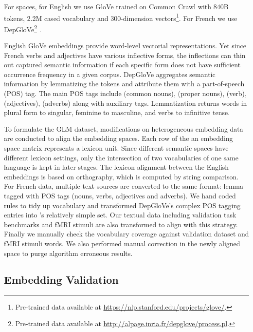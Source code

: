 For  spaces, for English we use GloVe \parencite{penningtonGloveGlobalVectors2014} trained on Common Crawl with 840B tokens, 2.2M cased vocabulary and 300-dimension vectors\footnote{Pre-trained data available at \url{https://nlp.stanford.edu/projects/glove/}.}. For French we use DepGloVe\footnote{Pre-trained data available at \url{http://alpage.inria.fr/depglove/process.pl}.} \parencite{delaclergerieDepGloveSmallServer}. 

English GloVe embeddings provide word-level vectorial representations. Yet since French verbs and adjectives have various inflective forms, the inflections can thin out captured semantic information if each specific form does not have sufficient occurrence frequency in a given corpus. DepGloVe aggregates semantic information by lemmatizing the tokens and attribute them with a part-of-speech (POS) tag. The main POS tags include  (common nouns),  (proper nouns),  (verb),  (adjectives),  (adverbs) along with auxiliary tags. Lemmatization returns words in plural form to singular, feminine to masculine, and verbs to infinitive tense.

To formulate the GLM dataset, modifications on heterogeneous embedding data are conducted to align the embedding spaces. Each row of the an embedding space matrix represents a lexicon unit. Since different semantic spaces have different lexicon settings, only the intersection of two vocabularies of one same language is kept in later stages. The lexicon alignment between the English embeddings is based on orthography, which is computed by string comparison. For French data, multiple text sources are converted to the same format: lemma tagged with  POS tags (nouns, verbs, adjectives and adverbs). We hand coded rules to tidy up  vocabulary and transformed DepGloVe's complex POS tagging entries into 's relatively simple set. Our textual data including validation task benchmarks and fMRI stimuli are also transformed to align with this strategy. Finally we manually check the vocabulary coverage against validation dataset and fMRI stimuli words. We also performed manual correction in the newly aligned space to purge algorithm erroneous results.  %

\subsection{Embedding Validation}


